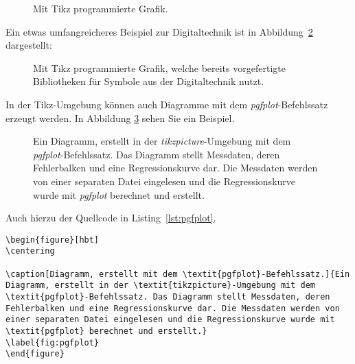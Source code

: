 \begin{figure}[hbt]
	\centering
	
	\caption[Mit Tikz programmierte Grafik.]{Mit Tikz programmierte Grafik.}
	\label{fig:tikz_house}
\end{figure}

Ein etwas umfangreicheres Beispiel zur Digitaltechnik ist in Abbildung~\ref{fig:tikz_digital} dargestellt:

\begin{figure}[hbt]
	\centering
	
	\caption[Mit Tikz programmierte Grafik, welche bereits vorgefertigte Bibliotheken für Symbole aus der Digitaltechnik nutzt.]{Mit Tikz programmierte Grafik, welche bereits vorgefertigte Bibliotheken für Symbole aus der Digitaltechnik nutzt.}
	\label{fig:tikz_digital}
\end{figure}


In der Tikz-Umgebung können auch Diagramme mit dem \textit{pgfplot}-Befehlssatz erzeugt werden. In Abbildung \ref{fig:pgfplot} sehen Sie ein Beispiel.

\begin{figure}[hbt]
	\centering
	
	\caption[Diagramm, erstellt mit dem \textit{pgfplot}-Befehlssatz.]{Ein Diagramm, erstellt in der \textit{tikzpicture}-Umgebung mit dem \textit{pgfplot}-Befehlssatz. Das Diagramm stellt Messdaten, deren Fehlerbalken und eine Regressionskurve dar. Die Messdaten werden von einer separaten Datei eingelesen und die Regressionskurve wurde mit \textit{pgfplot} berechnet und erstellt.}
	\label{fig:pgfplot}
\end{figure}

\clearpage

Auch hierzu der Quellcode in Listing~\ref{lst:pgfplot}.

\begin{lstlisting}[caption=Quellcode der Abbildung~\ref{fig:pgfplot}.,label=lst:pgfplot]
\begin{figure}[hbt]
\centering

\caption[Diagramm, erstellt mit dem \textit{pgfplot}-Befehlssatz.]{Ein Diagramm, erstellt in der \textit{tikzpicture}-Umgebung mit dem \textit{pgfplot}-Befehlssatz. Das Diagramm stellt Messdaten, deren Fehlerbalken und eine Regressionskurve dar. Die Messdaten werden von einer separaten Datei eingelesen und die Regressionskurve wurde mit \textit{pgfplot} berechnet und erstellt.}
\label{fig:pgfplot}
\end{figure}
\end{lstlisting}

